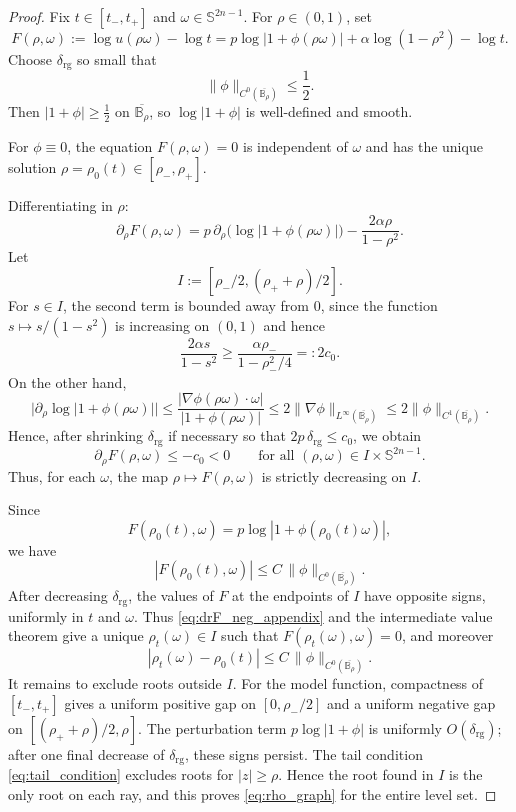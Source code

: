 \documentclass[11pt]{amsart}
\theoremstyle{plain}
\theoremstyle{definition}
\theoremstyle{remark}
\newcommand{\B}{\mathbb{B}}
\newcommand{\Sn}{\mathbb{S}^{2n-1}}
\begin{document}
\begin{proof}
Fix \(t\in[t_-,t_+]\) and \(\omega\in\Sn\). For \(\rho\in(0,1)\), set
\[
F(\rho,\omega):=\log u(\rho\omega)-\log t
=
p\log|1+\phi(\rho\omega)|+\alpha\log(1-\rho^2)-\log t.
\]
Choose \(\delta_{\mathrm{rg}}\) so small that
\[
\|\phi\|_{C^0(\overline{\B_\rho})}\le \frac12.
\]
Then \(|1+\phi|\ge \frac12\) on \(\overline{\B_\rho}\), so \(\log|1+\phi|\) is well-defined and smooth.

For \(\phi\equiv 0\), the equation \(F(\rho,\omega)=0\) is independent of \(\omega\) and has the unique solution
\(\rho=\rho_0(t)\in[\rho_-,\rho_+]\).

Differentiating in \(\rho\):
\[
\partial_\rho F(\rho,\omega)
=
p\,\partial_\rho\bigl(\log|1+\phi(\rho\omega)|\bigr)
-\frac{2\alpha\rho}{1-\rho^2}.
\]
Let
\[
I:=[\rho_-/2,(\rho_++\rho)/2].
\]
For $s\in I$, the second term is bounded away from $0$, since the function
$s\mapsto s/(1-s^2)$ is increasing on $(0,1)$ and hence
\[
\frac{2\alpha s}{1-s^2}
\ge
\frac{\alpha\rho_-}{1-\rho_-^2/4}
=:2c_0.
\]
On the other hand,
\[
\bigl|\partial_\rho\log|1+\phi(\rho\omega)|\bigr|
\le
\frac{|\nabla\phi(\rho\omega)\cdot\omega|}{|1+\phi(\rho\omega)|}
\le
2\|\nabla\phi\|_{L^\infty(\overline{\B_\rho})}
\le
2\|\phi\|_{C^1(\overline{\B_\rho})}.
\]
Hence, after shrinking \(\delta_{\mathrm{rg}}\) if necessary so that \(2p\,\delta_{\mathrm{rg}}\le c_0\), we obtain
\begin{equation}\label{eq:drF_neg_appendix}
\partial_\rho F(\rho,\omega)\le -c_0<0
\qquad\text{for all }(\rho,\omega)\in I\times\Sn.
\end{equation}
Thus, for each \(\omega\), the map \(\rho\mapsto F(\rho,\omega)\) is strictly decreasing on \(I\).

Since
\[
F(\rho_0(t),\omega)=p\log|1+\phi(\rho_0(t)\omega)|,
\]
we have
\[
|F(\rho_0(t),\omega)|
\le
C\,\|\phi\|_{C^0(\overline{\B_\rho})}.
\]
After decreasing $\delta_{\mathrm{rg}}$, the values of $F$ at the endpoints of
$I$ have opposite signs, uniformly in $t$ and $\omega$.  Thus
\eqref{eq:drF_neg_appendix} and the intermediate value theorem give a unique
\(\rho_t(\omega)\in I\) such that \(F(\rho_t(\omega),\omega)=0\), and moreover
\begin{equation}\label{eq:rho_Linf_est_appendix}
|\rho_t(\omega)-\rho_0(t)|
\le
C\,\|\phi\|_{C^0(\overline{\B_\rho})}.
\end{equation}
It remains to exclude roots outside $I$. For the model function, compactness
of $[t_-,t_+]$ gives a uniform positive gap on
$[0,\rho_-/2]$ and a uniform negative gap on
$[(\rho_++\rho)/2,\rho]$. The perturbation term
$p\log|1+\phi|$ is uniformly $O(\delta_{\mathrm{rg}})$; after one final
decrease of $\delta_{\mathrm{rg}}$, these signs persist. The tail condition
\eqref{eq:tail_condition} excludes roots for $|z|\ge\rho$. Hence the root
found in $I$ is the only root on each ray, and this proves
\eqref{eq:rho_graph} for the entire level set.


\end{proof}
\end{document}
